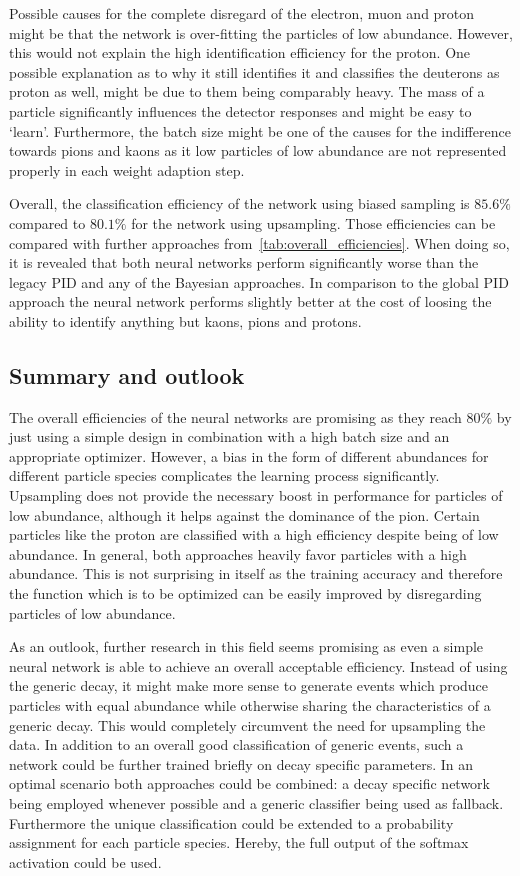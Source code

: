 Possible causes for the complete disregard of the electron, muon and proton might be that the network is over-fitting the particles of low abundance. However, this would not explain the high identification efficiency for the proton. One possible explanation as to why it still identifies it and classifies the deuterons as proton as well, might be due to them being comparably heavy. The mass of a particle significantly influences the detector responses and might be easy to `learn'.
Furthermore, the batch size might be one of the causes for the indifference towards pions and kaons as it low particles of low abundance are not represented properly in each weight adaption step.

Overall, the classification efficiency of the network using biased sampling is $85.6 \%$ compared to $80.1 \%$ for the network using upsampling. Those efficiencies can be compared with further approaches from~\autoref{tab:overall_efficiencies}. When doing so, it is revealed that both neural networks perform significantly worse than the legacy PID and any of the Bayesian approaches. In comparison to the global PID approach the neural network performs slightly better at the cost of loosing the ability to identify anything but kaons, pions and protons.

\subsection{Summary and outlook}
\label{subsc:neural_network_summary}

The overall efficiencies of the neural networks are promising as they reach $80 \%$ by just using a simple design in combination with a high batch size and an appropriate optimizer. However, a bias in the form of different abundances for different particle species complicates the learning process significantly. Upsampling does not provide the necessary boost in performance for particles of low abundance, although it helps against the dominance of the pion. Certain particles like the proton are classified with a high efficiency despite being of low abundance. In general, both approaches heavily favor particles with a high abundance. This is not surprising in itself as the training accuracy and therefore the function which is to be optimized can be easily improved by disregarding particles of low abundance.

As an outlook, further research in this field seems promising as even a simple neural network is able to achieve an overall acceptable efficiency. Instead of using the generic decay, it might make more sense to generate events which produce particles with equal abundance while otherwise sharing the characteristics of a generic decay. This would completely circumvent the need for upsampling the data. In addition to an overall good classification of generic events, such a network could be further trained briefly on decay specific parameters. In an optimal scenario both approaches could be combined: a decay specific network being employed whenever possible and a generic classifier being used as fallback. Furthermore the unique classification could be extended to a probability assignment for each particle species. Hereby, the full output of the softmax activation could be used.
